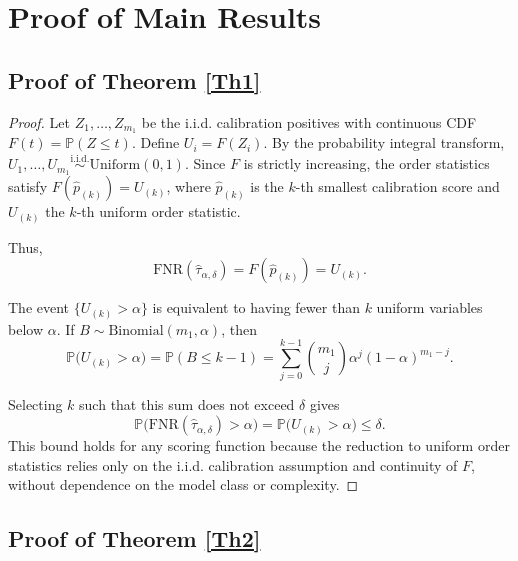 \documentclass[sigconf,review,anonymous]{acmart}
\theoremstyle{remark}
\begin{document}
\section{Proof of Main Results}\label{S6}

\subsection{Proof of Theorem \ref{Th1}}\label{S6-1}

\begin{proof}
Let $Z_1, \dots, Z_{m_1}$ be the i.i.d. calibration positives with continuous CDF $F(t) = \mathbb{P}(Z \leq t)$. 
Define $U_i = F(Z_i)$. 
By the probability integral transform, $U_1, \dots, U_{m_1} \stackrel{\text{i.i.d.}}{\sim} \mathrm{Uniform}(0,1)$. 
Since $F$ is strictly increasing, the order statistics satisfy $F(\hat{p}_{(k)}) = U_{(k)}$, where $\hat{p}_{(k)}$ is the $k$-th smallest calibration score and $U_{(k)}$ the $k$-th uniform order statistic.  

Thus,
\[
\mathrm{FNR}(\hat{\tau}_{\alpha,\delta}) = F(\hat{p}_{(k)}) = U_{(k)}.
\]

The event $\{U_{(k)} > \alpha\}$ is equivalent to having fewer than $k$ uniform variables below $\alpha$. 
If $B \sim \mathrm{Binomial}(m_1, \alpha)$, then
\[
\mathbb{P}\bigl(U_{(k)} > \alpha\bigr) 
= \mathbb{P}(B \le k-1) 
= \sum_{j=0}^{k-1} \binom{m_1}{j} \alpha^j (1-\alpha)^{m_1-j}.
\]

Selecting $k$ such that this sum does not exceed $\delta$ gives
\[
\mathbb{P}\bigl(\mathrm{FNR}(\hat{\tau}_{\alpha,\delta}) > \alpha\bigr) = \mathbb{P}\bigl(U_{(k)} > \alpha\bigr) \le \delta.
\]
This bound holds for any scoring function because the reduction to uniform order statistics relies only on the i.i.d. calibration assumption and continuity of $F$, without dependence on the model class or complexity.
\end{proof}

\subsection{Proof of Theorem \ref{Th2}}\label{S6-2}
\end{document}
